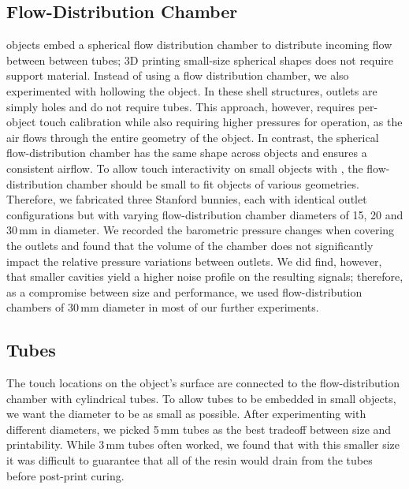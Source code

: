 			\subsection{Flow-Distribution Chamber}
				\at objects embed a spherical flow distribution chamber to distribute
				incoming flow between between tubes; 3D printing small-size spherical
				shapes does not require support material. Instead of using a flow
				distribution chamber, we also experimented with hollowing the object. In
				these shell structures, outlets are simply holes and do not require
				tubes. This approach, however, requires per-object touch calibration
				while also requiring higher pressures for operation, as the air flows
				through the entire geometry of the object. In contrast, the spherical
				flow-distribution chamber has the same shape across objects and ensures
				a consistent airflow. To allow touch interactivity on small objects with
				\at, the flow-distribution chamber should be small to fit objects of
				various geometries. Therefore, we fabricated three Stanford bunnies,
				each with identical outlet configurations but with varying
				flow-distribution chamber diameters of 15, 20 and 30\,mm in diameter. We
				recorded the barometric pressure changes when covering the outlets and
				found that the volume of the chamber does not significantly impact the
				relative pressure variations between outlets. We did find, however, that
				smaller cavities yield a higher noise profile on the resulting signals;
				therefore, as a compromise between size and performance, we used
				flow-distribution chambers of 30\,mm diameter in most of our further
				experiments.

			\subsection{Tubes}
		    The touch locations on the object's surface are connected to the
		    flow-distribution chamber with cylindrical tubes. To allow tubes to be
		    embedded in small objects, we want the diameter to be as small as
		    possible. After experimenting with different diameters, we picked 5\,mm
		    tubes as the best tradeoff between size and printability. While 3\,mm
		    tubes often worked, we found that with this smaller size it was
		    difficult to guarantee that all of the resin would drain from the tubes
		    before post-print curing.
		    
